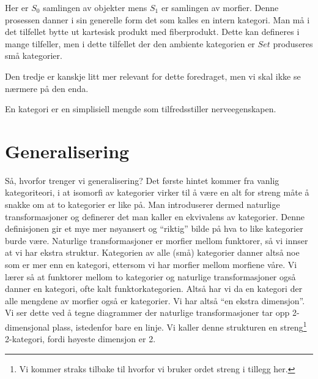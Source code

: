 Her er $S_0$ samlingen av objekter mens $S_1$ er samlingen av morfier. 
Denne prosessen danner i sin generelle form det som kalles en intern kategori. 
Man må i det tilfellet bytte ut kartesisk produkt med fiberprodukt. 
Dette kan defineres i mange tilfeller, men i dette tilfellet der den ambiente kategorien er $Set$ produseres små kategorier. 

Den tredje er kanskje litt mer relevant for dette foredraget, men vi skal ikke se nærmere på den enda. 

\begin{definition}
    En kategori er en simplisiell mengde som tilfredsstiller nerveegenskapen. 
\end{definition}


\section{Generalisering}

Så, hvorfor trenger vi generalisering? 
Det første hintet kommer fra vanlig kategoriteori, i at isomorfi av kategorier virker til å være en alt for streng måte å snakke om at to kategorier er like på. 
Man introduserer dermed naturlige transformasjoner og definerer det man kaller en ekvivalens av kategorier. 
Denne definisjonen gir et mye mer nøyansert og ``riktig'' bilde på hva to like kategorier burde være. 
Naturlige transformasjoner er morfier mellom funktorer, så vi innser at vi har ekstra struktur. 
Kategorien av alle (små) kategorier danner altså noe som er mer enn en kategori, ettersom vi har morfier mellom morfiene våre. 
Vi lærer så at funktorer mellom to kategorier og naturlige transformasjoner også danner en kategori, ofte kalt funktorkategorien. 
Altså har vi da en kategori der alle mengdene av morfier også er kategorier. 
Vi har altså ``en ekstra dimensjon''. 
Vi ser dette ved å tegne diagrammer der naturlige transformasjoner tar opp 2-dimensjonal plass, istedenfor bare en linje. 
Vi kaller denne strukturen en streng\footnote{Vi kommer straks tilbake til hvorfor vi bruker ordet streng i tillegg her.} 2-kategori, fordi høyeste dimensjon er 2.

\begin{center}
\end{center}

